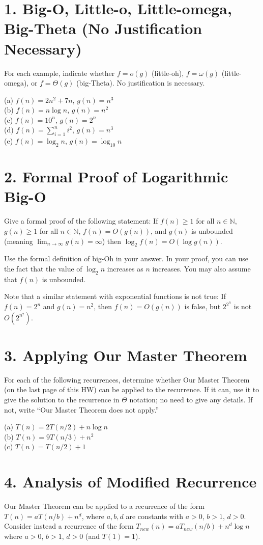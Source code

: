 \documentclass{article}
\begin{document}
\section*{1. Big-O, Little-o, Little-omega, Big-Theta (No Justification Necessary)}
For each example, indicate whether $f = o(g)$ (little-oh), $f = \omega(g)$ (little-omega), or $f = \Theta(g)$ (big-Theta). No justification is necessary.

(a) $f(n) = 2n^2 + 7n$, $g(n) = n^3$ \\
(b) $f(n) = n \log n$, $g(n) = n^2$ \\
(c) $f(n) = 10^n$, $g(n) = 2^n$ \\
(d) $f(n) = \sum_{i=1}^n i^2$, $g(n) = n^3$ \\
(e) $f(n) = \log_2 n$, $g(n) = \log_{10} n$


\section*{2. Formal Proof of Logarithmic Big-O}
Give a formal proof of the following statement: If $f(n) \ge 1$ for all $n \in \mathbb{N}$, $g(n) \ge 1$ for all $n \in \mathbb{N}$, $f(n) = O(g(n))$, and $g(n)$ is unbounded (meaning $\lim_{n\to\infty} g(n) = \infty$) then $\log_2 f(n) = O(\log g(n))$.

Use the formal definition of big-Oh in your answer. In your proof, you can use the fact that the value of $\log_2 n$ increases as $n$ increases.  You may also assume that $f(n)$ is unbounded.

Note that a similar statement with exponential functions is not true: If $f(n) = 2^n$ and $g(n) = n^2$, then $f(n) = O(g(n))$ is false, but $2^{2^n}$ is not $O(2^{n^2})$.


\section*{3. Applying Our Master Theorem}
For each of the following recurrences, determine whether Our Master Theorem (on the last page of this HW) can be applied to the recurrence. If it can, use it to give the solution to the recurrence in $\Theta$ notation; no need to give any details. If not, write “Our Master Theorem does not apply.”

(a) $T(n) = 2T(n/2) + n \log n$ \\
(b) $T(n) = 9T(n/3) + n^2$ \\
(c) $T(n) = T(n/2) + 1$


\section*{4. Analysis of Modified Recurrence}
Our Master Theorem can be applied to a recurrence of the form $T(n) = aT(n/b) + n^d$, where $a, b, d$ are constants with $a > 0$, $b > 1$, $d > 0$. Consider instead a recurrence of the form $T_{new}(n) = aT_{new}(n/b) + n^d \log n$ where $a > 0$, $b > 1$, $d > 0$ (and $T(1) = 1$).
\end{document}
